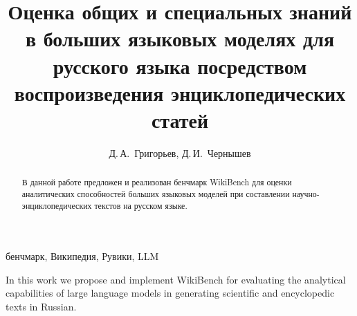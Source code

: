 \documentclass{article}
\theoremstyle{definition}
\theoremstyle{plain}
\begin{document}


\title{Оценка общих и специальных знаний в больших языковых моделях для русского языка посредством воспроизведения энциклопедических статей}

\author{Д.\,А.~Григорьев\Addressmark[1]\Emailmark[1], Д.\,И.~Чернышев\Addressmark[1]\Emailmark[2]}











\maketitle


\begin{abstract}
В данной работе предложен и реализован бенчмарк WikiBench для оценки аналитических способностей больших языковых моделей при составлении научно-энциклопедических текстов на русском языке. 
\end{abstract}

\begin{keywords}
бенчмарк, Википедия, Рувики, LLM
\end{keywords}

\begin{altabstract}
In this work we propose and implement WikiBench for evaluating the analytical capabilities of large language models in generating scientific and encyclopedic texts in Russian.
\end{altabstract}
\end{document}
